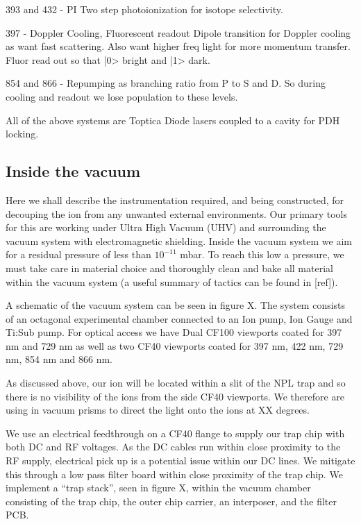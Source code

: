 \documentclass[12pt]{iopart}
\begin{document}
393 and 432 - PI 
Two step photoionization for isotope selectivity.

397 - Doppler Cooling, Fluorescent readout
Dipole transition for Doppler cooling as want fast scattering. Also
want higher freq light for more momentum transfer.
Fluor read out so that |0> bright and |1> dark.

854 and 866 - Repumping as branching ratio from P to S and D. So
during cooling and readout we lose population to these levels.

All of the above systems are Toptica Diode lasers coupled to a cavity
for PDH locking.


\subsection{Inside the vacuum}

Here we shall describe the instrumentation required, and being
constructed, for decouping the ion from any unwanted external
environments. Our primary tools for this are working under Ultra High
Vacuum (UHV) and surrounding the vacuum system with electromagnetic
shielding. Inside the vacuum system we aim for a residual pressure of
less than $10^{-11}$ mbar. To reach this low a pressure, we must take
care in material choice and thoroughly clean and bake all material
within the vacuum system (a useful summary of tactics can be found in [ref]).

A schematic of the vacuum system can be seen in figure X. The system
consists of an octagonal experimental chamber connected to an Ion
pump, Ion Gauge and Ti:Sub pump. For optical access we have Dual CF100
viewports coated for 397 nm and 729 nm as well as two CF40 viewports
coated for 397 nm, 422 nm, 729 nm, 854 nm and 866 nm.

As discussed above, our ion will be located within a slit of the NPL
trap and so there is no visibility of the ions from the side CF40
viewports. We therefore are using in vacuum prisms to direct the light
onto the ions at XX degrees.

We use an electrical feedthrough on a CF40 flange to supply our trap
chip with both DC and RF voltages. As the DC cables run within close
proximity to the RF supply, electrical pick up is a potential issue
within our DC lines. We mitigate this through a low pass filter board
within close proximity of the trap chip. We implement a ``trap
stack'', seen in figure X, within the vacuum chamber consisting of the
trap chip, the outer chip carrier, an interposer, and the filter PCB.
\end{document}
